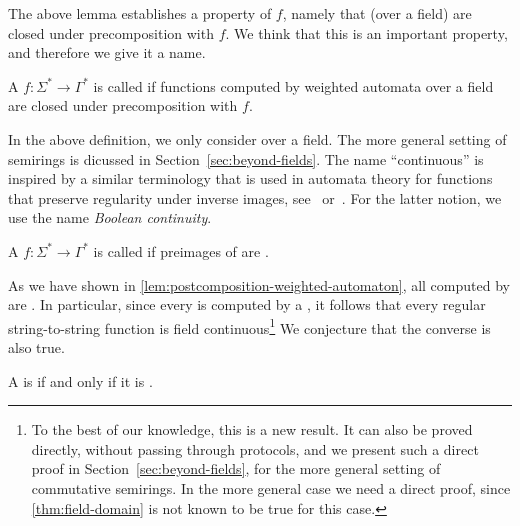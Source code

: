 The above lemma establishes a property of $f$, namely that 
(over a field) are closed under precomposition with $f$. We think that this is
an important property, and therefore we give it a name.

\begin{definition}
    \label{def:weighted-continuity}
    \AP
    A  $f : \Sigma^* \to \Gamma^*$ is called
     if functions computed by weighted automata over a
    field are closed under precomposition with $f$.
\end{definition}

In the above definition, we only consider  over a field. The
more general setting of semirings is dicussed in
Section~\ref{sec:beyond-fields}. The name ``continuous'' is inspired by a
similar terminology that is used in automata theory for functions that preserve
regularity under inverse images, see~\cite[Theorem 4.1]{PinSilva05}
or~\cite[Footnote 2]{continuity20}. For the latter notion, we use the name
\emph{Boolean continuity}.

\begin{definition}
  \AP
  A  $f : \Sigma^* \to \Gamma^*$ is called
   if preimages of  are .
\end{definition}

As we have shown in \cref{lem:postcomposition-weighted-automaton}, all
 computed by  are . In
particular, since every  is computed by a
, it follows that every regular string-to-string function is field
continuous\footnote{To the best of our knowledge, this is a new result. It can
also be proved directly, without passing through protocols, and we present such
a direct proof in Section~\ref{sec:beyond-fields}, for the more general setting
of commutative semirings. In the more general case we need a direct proof,
since \cref{thm:field-domain} is not known to be true for this case.} We
conjecture that the converse is also true.

\begin{conjecture}\label{conj:regular-continuous}
  A  is  if and only if it is 
  .
\end{conjecture}

